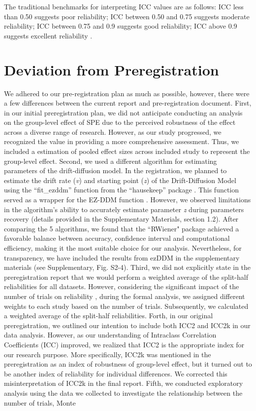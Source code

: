 \documentclass[sn-apa]{sn-jnl}%
\theoremstyle{thmstyleone}%
\theoremstyle{thmstyletwo}%
\theoremstyle{thmstylethree}%
\begin{document}
 The traditional benchmarks for interpreting ICC values are as follows: ICC less than 0.50 suggests poor reliability; ICC between 0.50 and 0.75 suggests moderate reliability; ICC between 0.75 and 0.9 suggests good reliability; ICC above 0.9 suggests excellent reliability \parencite{cicchetti1981developing,kupper2020on}.

\section{Deviation from Preregistration}\label{sec:deviation}

We adhered to our pre-registration plan as much as possible, however, there were a few differences between the current report and pre-registration document. First, in our initial preregistration plan, we did not anticipate conducting an analysis on the group-level effect of SPE due to the perceived robustness of the effect across a diverse range of research. However, as our study progressed, we recognized the value in providing a more comprehensive assessment. Thus, we included a estimation of pooled effect sizes across included study to represent the group-level effect. Second, we used a different algorithm for estimating parameters of the drift-diffusion model. In the registration, we planned to estimate the drift rate (\textit{v}) and starting point (\textit{z}) of the Drift-Diffusion Model using the ``fit\_ezddm” function from the ``hausekeep” package \parencite{lin2020strong}. This function served as a wrapper for the EZ-DDM function \parencite{wagenmakers2007an}. However, we observed limitations in the algorithm's ability to accurately estimate parameter \textit{z} during parameters recovery (details provided in the Supplementary Materials, section 1.2). After comparing the 5 algorithms, we found that the ``RWiener" package \parencite{wabersich2014rwiener} achieved a favorable balance between accuracy, confidence interval and computational efficiency, making it the most suitable choice for our analysis. Nevertheless, for transparency, we have included the results from ezDDM in the supplementary materials (see Supplementary, Fig. S2-4). Third, we did not explicitly state in the preregistration report that we would perform a weighted average of the split-half reliabilities for all datasets. However, considering the significant impact of the number of trials on reliability \parencite{kucina2023calibration}, during the formal analysis, we assigned different weights to each study based on the number of trials. Subsequently, we calculated a weighted average of the split-half reliabilities. Forth, in our original preregistration, we outlined our intention to include both ICC2 and ICC2k in our data analysis. However, as our understanding of Intraclass Correlation Coefficients (ICC) improved, we realized that ICC2 is the appropriate index for our research purpose. More specifically, ICC2k was mentioned in the preregistration as an index of robustness of group-level effect, but it turned out to be another index of reliability for individual differences. We corrected this misinterpretation of ICC2k in the final report. Fifth, we conducted exploratory analysis using the data we collected to investigate the relationship between the number of trials, Monte 
\end{document}
